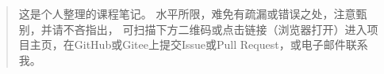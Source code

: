\begin{abstract}
这是个人整理的课程笔记。
水平所限，难免有疏漏或错误之处，注意甄别，并请不吝指出，
可扫描下方二维码或点击链接（浏览器打开）进入项目主页，在GitHub或Gitee上提交Issue或Pull Request，或电子邮件联系我。
\end{abstract}